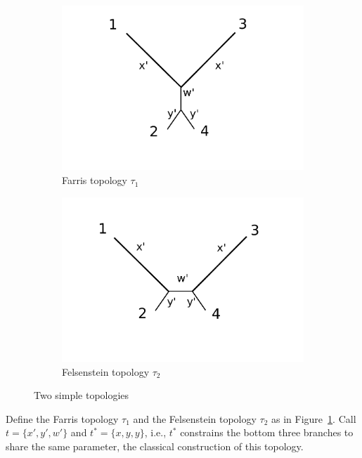 \documentclass[a4paper]{article}
\begin{document}
\begin{figure}
\centering
\begin{subfigure}{.45\linewidth}
\centering
\includegraphics[width=.95\textwidth]{farris_blank}
\caption[short]{Farris topology $\tau_1$}
\end{subfigure}
\begin{subfigure}{.45\linewidth}
\centering
\includegraphics[width=.95\textwidth]{felsenstein_blank}
\caption[short]{Felsenstein topology $\tau_2$}
\end{subfigure}
\caption{Two simple topologies}
\label{fig:farris-fels-top}
\end{figure}

Define the Farris topology $\tau_1$ and the Felsenstein topology $\tau_2$ as in Figure~\ref{fig:farris-fels-top}.
Call $t=\{x',y',w'\}$ and $t^*=\{x,y,y\}$, i.e., $t^*$ constrains the bottom three branches to share the same parameter, the classical construction of this topology.
\end{document}
